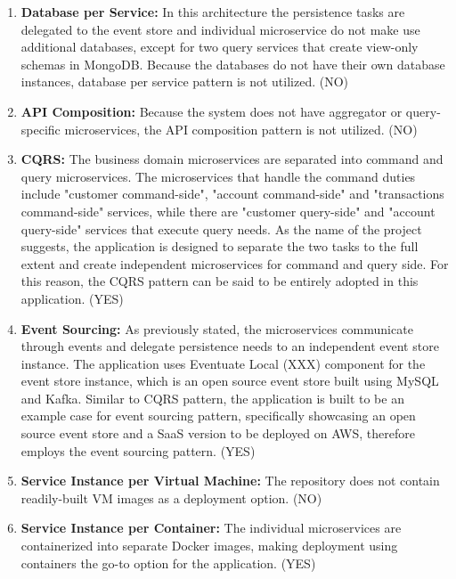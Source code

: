 \documentclass{Configuration_Files/PoliMi3i_thesis}
\begin{document}
\begin{enumerate}
    \item \textbf{Database per Service:} In this architecture the persistence tasks are delegated to the event store and individual microservice do not make use additional databases, except for two query services that create view-only schemas in MongoDB.
    Because the databases do not have their own database instances, database per service pattern is not utilized. (NO)
    
    \item \textbf{API Composition:} Because the system does not have aggregator or query-specific microservices, the API composition pattern is not utilized. (NO)
    
    \item \textbf{CQRS:} The business domain microservices are separated into command and query microservices.
    The microservices that handle the command duties include "customer command-side", "account command-side" and "transactions command-side" services, while there are "customer query-side" and "account query-side" services that execute query needs.
    As the name of the project suggests, the application is designed to separate the two tasks to the full extent and create independent microservices for command and query side.
    For this reason, the CQRS pattern can be said to be entirely adopted in this application. (YES)
    
    \item \textbf{Event Sourcing:} As previously stated, the microservices communicate through events and delegate persistence needs to an independent event store instance.
    The application uses Eventuate Local (XXX) component for the event store instance, which is an open source event store built using MySQL and Kafka.
    Similar to CQRS pattern, the application is built to be an example case for event sourcing pattern, specifically showcasing an open source event store and a SaaS version to be deployed on AWS, therefore employs the event sourcing pattern. (YES)
    
    \item \textbf{Service Instance per Virtual Machine:} The repository does not contain readily-built VM images as a deployment option. (NO)
    
    \item \textbf{Service Instance per Container:} The individual microservices are containerized into separate Docker images, making deployment using containers the go-to option for the application. (YES)
    

\end{enumerate}
\end{document}
